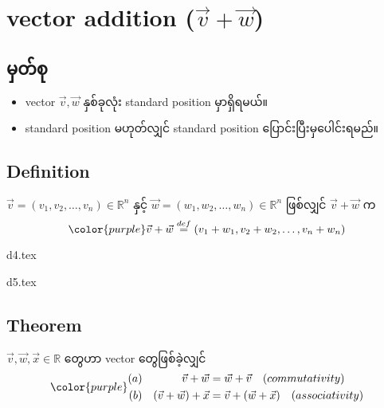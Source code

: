 \section{vector addition ($\vec{v}+\vec{w}$)}
\subsection{မှတ်စု}
\begin{itemize}
    \item vector $\vec{v}, \vec{w}$ နှစ်ခုလုံး standard position မှာရှိရမယ်။
    \item standard position မဟုတ်လျှင် standard position ပြောင်းပြီးမှပေါင်းရမည်။
\end{itemize}
\subsection{Definition}
$\vec{v}=(v_1,v_2,\dots,v_n)\in\mathbb{R}^n$ နှင့် $\vec{w}=(w_1,w_2,\dots,w_n)\in\mathbb{R}^n$ ဖြစ်လျှင် $\vec{v}+\vec{w}$ က
\begin{equation}
    \centering
    {\color{purple} \vec{v}+\vec{w}\stackrel{def}{=}(v_1+w_1,v_2+w_2,\dots,v_n+w_n)}
    \label{eq:vector-addition}
\end{equation}
\begin{minipage}{0.45\textwidth}
    \centering
    {d4.tex}
\end{minipage}
\hfill
\begin{minipage}{0.45\textwidth}
    \centering
    {d5.tex}
\end{minipage}
\subsection{Theorem}
$\vec{v}, \vec{w}, \vec{x} \in\mathbb{R}$ တွေဟာ vector တွေဖြစ်ခဲ့လျှင်
\begin{equation}
    {\color{purple} \begin{split}
            (a)\hspace{1.25cm}\vec{v}+\vec{w} & =\vec{w}+\vec{v}\quad{(commutativity)}            \\
            (b)\quad(\vec{v}+\vec{w})+\vec{x} & = \vec{v}+(\vec{w}+\vec{x})\quad{(associativity)}
        \end{split}}
    \label{eq:vector-addition-theorem}
\end{equation}
